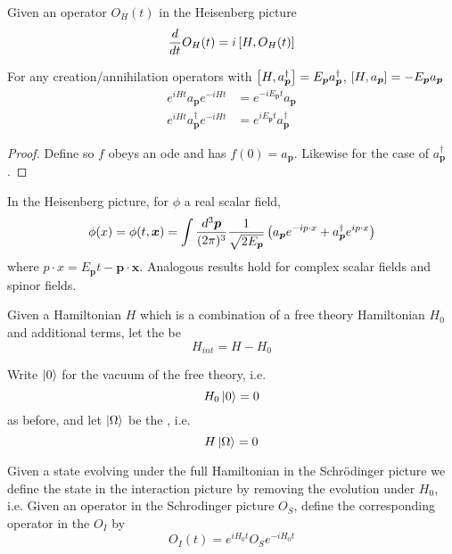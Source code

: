 \documentclass{article}
\begin{document}
\begin{theorem}
Given an operator $O_H(t)$ in the Heisenberg picture 
\[
\frac{d}{dt} O_H(t) = i \comm[H]{O_H(t)}
\]
\end{theorem}

\begin{theorem}
For any creation/annihilation operators with $\comm[H]{a_{\bm{p}}^\dagger} =  E_{\bm{p}} a_{\bm{p}}^\dagger$, $\comm[H]{a_{\bm{p}}} = - E_{\bm{p}} a_{\bm{p}}$
\begin{align*}
e^{iHt} a_{\bm{p}}  e^{-iHt} &= e^{-iE_{\bm{p}}t} a_{\bm{p}} \\
e^{iHt} a_{\bm{p}}^\dagger  e^{-iHt} &= e^{iE_{\bm{p}}t} a_{\bm{p}}^\dagger
\end{align*}
\end{theorem}
\begin{proof}
Define 
so $f$ obeys an ode and has $f(0) = a_{\bm{p}}$. Likewise for the case of $a_{\bm{p}}^\dagger$. 
\end{proof}

\begin{theorem}
In the Heisenberg picture, for $\phi$ a real scalar field, 
\[
\phi(x)=\phi(t,\bm{x}) = \int\tmeas  \frac{1}{\sqrt{2E_{\bm{p}}}} \left( a_{\bm{p}} e^{-i p\cdot x} + a_{\bm{p}}^\dagger e^{i p\cdot x} \right)
\]
where $p\cdot x = E_{\bm{p}}t-\bm{p}\cdot\bm{x}$. Analogous results hold for complex scalar fields and spinor fields. 
\end{theorem} 

\begin{definition}
Given a Hamiltonian $H$ which is a combination of a free theory Hamiltonian $H_0$ and additional terms, let the  be 
\[
H_{int} = H - H_0
\]
\end{definition}

\begin{definition}
Write $\ket{0}$ for the vacuum of the free theory, i.e. 
\[
H_0 \ket{0} = 0
\]
as before, and let $\ket{\Omega}$ be the , i.e. \[
H \ket{\Omega} = 0
\]
\end{definition}

\begin{definition}
Given a state evolving under the full Hamiltonian in the Schr\"odinger picture 
we define the state in the interaction picture by removing the evolution under $H_0$, i.e. 
Given an operator in the Schrodinger picture $O_S$, define the corresponding operator in the  $O_I$ by 
\[
O_I(t) = e^{iH_0t} O_S e^{-iH_0t}
\]
\end{definition}
\end{document}

